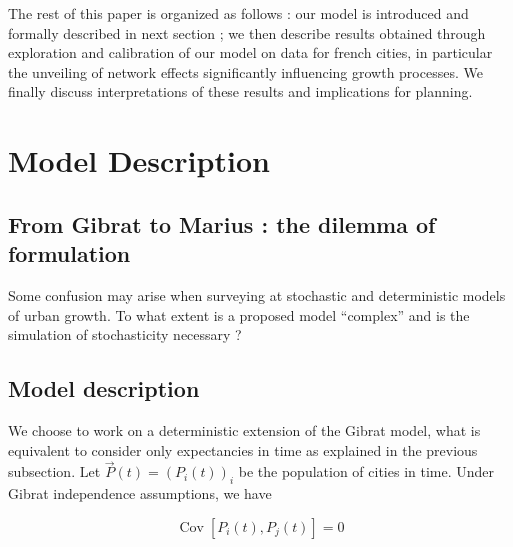 \documentclass[Royal,sageh,times]{sagej}
\DeclareMathOperator{\Cov}{Cov}
\newcommand{\Covb}[2]{\ensuremath{\Cov\!\left[#1,#2\right]}}
\begin{document}
The rest of this paper is organized as follows : our model is introduced and formally described in next section ; we then describe results obtained through exploration and calibration of our model on data for french cities, in particular the unveiling of network effects significantly influencing growth processes. We finally discuss interpretations of these results and implications for planning.





\section{Model Description}




\subsection{From Gibrat to Marius : the dilemma of formulation}



Some confusion may arise when surveying at stochastic and deterministic models of urban growth. To what extent is a proposed model ``complex'' and is the simulation of stochasticity necessary ? 





\subsection{Model description}

We choose to work on a deterministic extension of the Gibrat model, what is equivalent to consider only expectancies in time as explained in the previous subsection. Let $\vec{P}(t)=(P_i(t))_i$ be the population of cities in time. Under Gibrat independence assumptions, we have

\[
\Covb{P_i(t)}{P_j(t)}=0
\]
\end{document}
